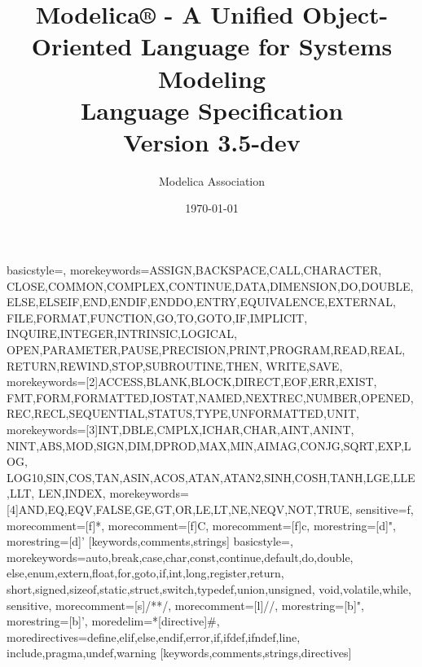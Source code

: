 %
  {basicstyle=\small\ttfamily,        %
   morekeywords={ASSIGN,BACKSPACE,CALL,CHARACTER,%
      CLOSE,COMMON,COMPLEX,CONTINUE,DATA,DIMENSION,DO,DOUBLE,%
      ELSE,ELSEIF,END,ENDIF,ENDDO,ENTRY,EQUIVALENCE,EXTERNAL,%
      FILE,FORMAT,FUNCTION,GO,TO,GOTO,IF,IMPLICIT,%
      INQUIRE,INTEGER,INTRINSIC,LOGICAL,%
      OPEN,PARAMETER,PAUSE,PRECISION,PRINT,PROGRAM,READ,REAL,%
      RETURN,REWIND,STOP,SUBROUTINE,THEN,%
      WRITE,SAVE},%
    morekeywords=[2]{ACCESS,BLANK,BLOCK,DIRECT,EOF,ERR,EXIST,%
      FMT,FORM,FORMATTED,IOSTAT,NAMED,NEXTREC,NUMBER,OPENED,%
      REC,RECL,SEQUENTIAL,STATUS,TYPE,UNFORMATTED,UNIT},%
    morekeywords=[3]{INT,DBLE,CMPLX,ICHAR,CHAR,AINT,ANINT,%
      NINT,ABS,MOD,SIGN,DIM,DPROD,MAX,MIN,AIMAG,CONJG,SQRT,EXP,LOG,%
      LOG10,SIN,COS,TAN,ASIN,ACOS,ATAN,ATAN2,SINH,COSH,TANH,LGE,LLE,LLT,%
      LEN,INDEX},%
    morekeywords=[4]{AND,EQ,EQV,FALSE,GE,GT,OR,LE,LT,NE,NEQV,NOT,TRUE},%
   sensitive=f,%
   morecomment=[f]*,%
   morecomment=[f]C,%
   morecomment=[f]c,%
   morestring=[d]",%
   morestring=[d]'%
  }[keywords,comments,strings]%
%
  {basicstyle=\small\ttfamily,        %
   morekeywords={auto,break,case,char,const,continue,default,do,double,%
      else,enum,extern,float,for,goto,if,int,long,register,return,%
      short,signed,sizeof,static,struct,switch,typedef,union,unsigned,%
      void,volatile,while},%
   sensitive,%
   morecomment=[s]{/*}{*/},%
   morecomment=[l]//,%
   morestring=[b]",%
   morestring=[b]',%
   moredelim=*[directive]\#,%
   moredirectives={define,elif,else,endif,error,if,ifdef,ifndef,line,%
      include,pragma,undef,warning}%
  }[keywords,comments,strings,directives]%




\title{Modelica® - A Unified Object-Oriented Language for Systems
Modeling\\[2\baselineskip]Language
Specification\\[2\baselineskip]Version 3.5-dev}
\date{\today}
\author{Modelica Association}
